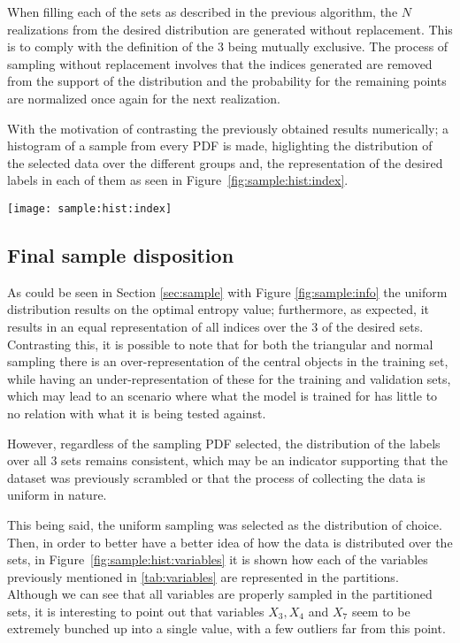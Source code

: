 \documentclass[journal]{IEEEtran}
\begin{document}
When filling each of the sets as described in the previous algorithm, the $N$
realizations from the desired distribution are generated without replacement.
This is to comply with the definition of the $3$ being mutually exclusive. The
process of sampling without replacement involves that the indices generated are
removed from the support of the distribution and the probability for the
remaining points are normalized once again for the next realization.

With the motivation of contrasting the previously obtained results numerically;
a histogram of a sample from every PDF is made, higlighting the distribution of
the selected data over the different groups and, the representation of the
desired labels in each of them as seen in Figure~\ref{fig:sample:hist:index}.

\begin{figure*}[ht]
    \texttt{[image: sample:hist:index]}
    \caption{Example of a figure caption. \label{fig:sample:hist:index}}
\end{figure*}


\subsection{Final sample disposition\label{sec:sample:final}}

As could be seen in Section \ref{sec:sample} with Figure \ref{fig:sample:info}
the uniform distribution results on the optimal entropy value; furthermore, as
expected, it results in an equal representation of all indices over the $3$ of
the desired sets. Contrasting this, it is possible to note that for both the
triangular and normal sampling there is an over-representation of the central
objects in the training set, while having an under-representation of these for
the training and validation sets, which may lead to an scenario where what the
model is trained for has little to no relation with what it is being tested
against.

However, regardless of the sampling PDF selected, the distribution of the labels
over all $3$ sets remains consistent, which may be an indicator supporting that the
dataset was previously scrambled or that the process of collecting the data is
uniform in nature.

This being said, the uniform sampling was selected as the distribution of
choice. Then, in order to better have a better idea of how the data is
distributed over the sets, in Figure~\ref{fig:sample:hist:variables} it is shown
how each of the variables previously mentioned in \ref{tab:variables} are
represented in the partitions. Although we can see that all variables are
properly sampled in the partitioned sets, it is interesting to point out that
variables $X_3, X_4$ and $X_7$ seem to be extremely bunched up into a single
value, with a few outliers far from this point. 
\end{document}
